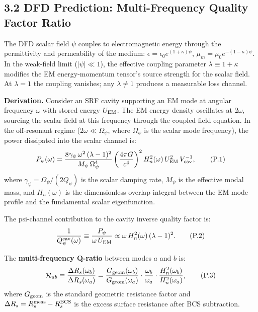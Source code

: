 \documentclass[11pt]{article}
\theoremstyle{definition}
\theoremstyle{remark}
\begin{document}
\begin{tcolorbox}[colback=white, colframe=black,
  title=\textbf{PROPOSAL TEXT --- Extract verbatim for SQMS Phase I},
  breakable]

\subsection*{3.2 \quad DFD Prediction: Multi-Frequency Quality Factor Ratio}

The DFD scalar field $\psi$ couples to electromagnetic energy through
the permittivity and permeability of the medium: $\epsilon = \epsilon_0
e^{(1+\kappa)\psi}$, $\mu_m = \mu_0 e^{-(1-\kappa)\psi}$. In the
weak-field limit ($|\psi| \ll 1$), the effective coupling parameter
$\lambda \equiv 1 + \kappa$ modifies the EM energy-momentum tensor's
source strength for the scalar field. At $\lambda = 1$ the coupling
vanishes; any $\lambda \neq 1$ produces a measurable loss channel.

\textbf{Derivation.} Consider an SRF cavity supporting an EM mode at
angular frequency $\omega$ with stored energy $U_{\rm EM}$. The EM
energy density oscillates at $2\omega$, sourcing the scalar field at
this frequency through the coupled field equation. In the
off-resonant regime ($2\omega \ll \Omega_\psi$, where $\Omega_\psi$
is the scalar mode frequency), the power dissipated into the scalar
channel is:
\begin{equation}
P_\psi(\omega) = \frac{8\gamma_\psi\,\omega^2\,(\lambda - 1)^2}
{M_\psi\,\Omega_\psi^4}
\left(\frac{4\pi G}{c^4}\right)^2
H_n^2(\omega)\,U_{\rm EM}^2\,V_{\rm cav}^{-1},
\tag{P.1}
\end{equation}
where $\gamma_\psi = \Omega_\psi/(2Q_\psi)$ is the scalar damping
rate, $M_\psi$ is the effective modal mass, and $H_n(\omega)$ is the
dimensionless overlap integral between the EM mode profile and the
fundamental scalar eigenfunction.

The psi-channel contribution to the cavity inverse quality factor is:
\begin{equation}
\frac{1}{Q_\psi^{\rm cav}(\omega)} \equiv
\frac{P_\psi}{\omega\,U_{\rm EM}}
\propto \omega\,H_n^2(\omega)\,(\lambda - 1)^2.
\tag{P.2}
\end{equation}

The \textbf{multi-frequency Q-ratio} between modes $a$ and $b$ is:
\begin{equation}
\mathcal{R}_{ab} \equiv
\frac{\Delta R_s(\omega_b)}{\Delta R_s(\omega_a)}
= \frac{G_{\rm geom}(\omega_b)}{G_{\rm geom}(\omega_a)}
\cdot \frac{\omega_b}{\omega_a}
\cdot \frac{H_n^2(\omega_b)}{H_n^2(\omega_a)},
\tag{P.3}
\end{equation}
where $G_{\rm geom}$ is the standard geometric resistance factor and
$\Delta R_s = R_s^{\rm meas} - R_s^{\rm BCS}$ is the excess surface
resistance after BCS subtraction.


\end{tcolorbox}
\end{document}
